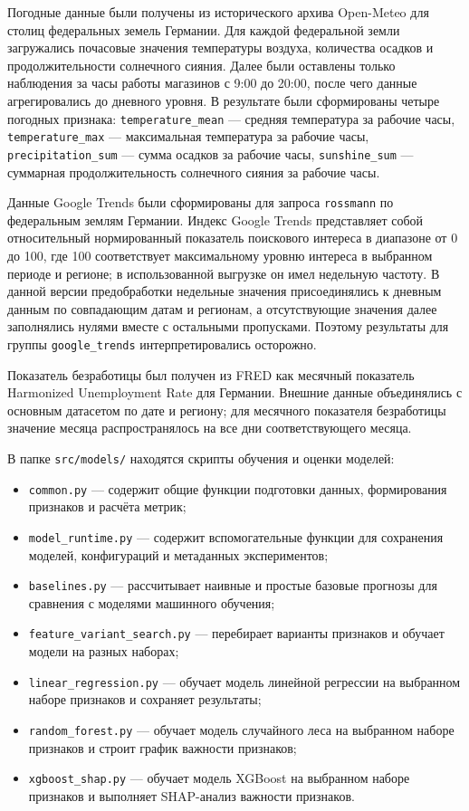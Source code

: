 \documentclass[12pt,a4paper]{article}
\numberwithin{equation}{section}
\begin{document}
Погодные данные были получены из исторического архива Open-Meteo \cite{openmeteo} для столиц федеральных земель Германии. Для каждой федеральной земли загружались почасовые значения температуры воздуха, количества осадков и продолжительности солнечного сияния. Далее были оставлены только наблюдения за часы работы магазинов с 9:00 до 20:00, после чего данные агрегировались до дневного уровня. В результате были сформированы четыре погодных признака: \texttt{temperature\_mean} --- средняя температура за рабочие часы, \texttt{temperature\_max} --- максимальная температура за рабочие часы, \texttt{precipitation\_sum} --- сумма осадков за рабочие часы, \texttt{sunshine\_sum} --- суммарная продолжительность солнечного сияния за рабочие часы.

Данные Google Trends \cite{googletrends} были сформированы для запроса \texttt{rossmann} по федеральным землям Германии. Индекс Google Trends представляет собой относительный нормированный показатель поискового интереса в диапазоне от 0 до 100, где 100 соответствует максимальному уровню интереса в выбранном периоде и регионе; в использованной выгрузке он имел недельную частоту. В данной версии предобработки недельные значения присоединялись к дневным данным по совпадающим датам и регионам, а отсутствующие значения далее заполнялись нулями вместе с остальными пропусками. Поэтому результаты для группы \texttt{google\_trends} интерпретировались осторожно.

Показатель безработицы был получен из FRED \cite{fredunemployment} как месячный показатель Harmonized Unemployment Rate для Германии. Внешние данные объединялись с основным датасетом по дате и региону; для месячного показателя безработицы значение месяца распространялось на все дни соответствующего месяца.

В папке \texttt{src/models/} находятся скрипты обучения и оценки моделей:
\begin{itemize}
    \item \texttt{common.py} --- содержит общие функции подготовки данных, формирования признаков и расчёта метрик;
    \item \texttt{model\_runtime.py} --- содержит вспомогательные функции для сохранения моделей, конфигураций и метаданных экспериментов;
    \item \texttt{baselines.py} --- рассчитывает наивные и простые базовые прогнозы для сравнения с моделями машинного обучения;
    \item \texttt{feature\_variant\_search.py} --- перебирает варианты признаков и обучает модели на разных наборах;
    \item \texttt{linear\_regression.py} --- обучает модель линейной регрессии на выбранном наборе признаков и сохраняет результаты;
    \item \texttt{random\_forest.py} --- обучает модель случайного леса на выбранном наборе признаков и строит график важности признаков;
    \item \texttt{xgboost\_shap.py} --- обучает модель XGBoost на выбранном наборе признаков и выполняет SHAP-анализ важности признаков.
\end{itemize}
\end{document}
